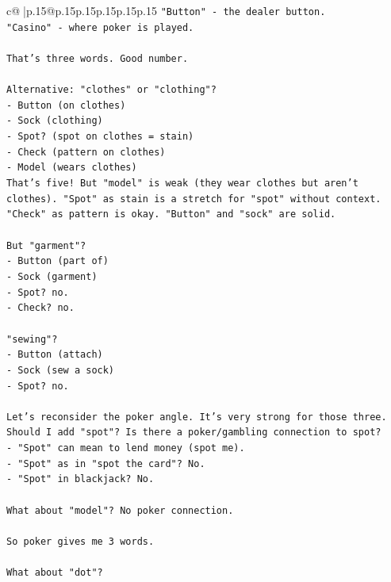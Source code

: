 \documentclass{article}
\begin{document}
{\begin{supertabular}{c@{$\;$}|p{.15\linewidth}@{}p{.15\linewidth}p{.15\linewidth}p{.15\linewidth}p{.15\linewidth}p{.15\linewidth}}
{{{\texttt{"Button" {-} the dealer button.} \\
\texttt{"Casino" {-} where poker is played.} \\
\\ 
\texttt{That's three words. Good number.} \\
\\ 
\texttt{Alternative: "clothes" or "clothing"?} \\
\texttt{{-} Button (on clothes)} \\
\texttt{{-} Sock (clothing)} \\
\texttt{{-} Spot? (spot on clothes = stain)} \\
\texttt{{-} Check (pattern on clothes)} \\
\texttt{{-} Model (wears clothes)} \\
\texttt{That's five! But "model" is weak (they wear clothes but aren't clothes). "Spot" as stain is a stretch for "spot" without context. "Check" as pattern is okay. "Button" and "sock" are solid.} \\
\\ 
\texttt{But "garment"?} \\
\texttt{{-} Button (part of)} \\
\texttt{{-} Sock (garment)} \\
\texttt{{-} Spot? no.} \\
\texttt{{-} Check? no.} \\
\\ 
\texttt{"sewing"?} \\
\texttt{{-} Button (attach)} \\
\texttt{{-} Sock (sew a sock)} \\
\texttt{{-} Spot? no.} \\
\\ 
\texttt{Let's reconsider the poker angle. It's very strong for those three. Should I add "spot"? Is there a poker/gambling connection to spot?} \\
\texttt{{-} "Spot" can mean to lend money (spot me).} \\
\texttt{{-} "Spot" as in "spot the card"? No.} \\
\texttt{{-} "Spot" in blackjack? No.} \\
\\ 
\texttt{What about "model"? No poker connection.} \\
\\ 
\texttt{So poker gives me 3 words.} \\
\\ 
\texttt{What about "dot"?} \\
}}}
\end{supertabular}}
\end{document}
